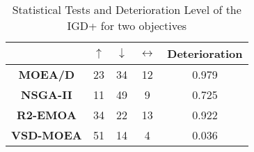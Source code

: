 \begin{table}[t]
\caption{Statistical Tests and Deterioration Level of the IGD+ for two objectives}
\label{tab:Tests_HV_2obj}
\centering
\begin{tabular}{c c|c|c|c}
\cline{2-5}
                                        & \textbf{$\uparrow$} & \textbf{$\downarrow$} & \textbf{$\leftrightarrow$} & \textbf{Deterioration} \\ \hline
\multicolumn{1}{c|}{\textbf{MOEA/D}}   & 23                  & 34                    & 12                         & 0.979         \\ \hline
\multicolumn{1}{c|}{\textbf{NSGA-II}}  & 11                  & 49                    & 9                          & 0.725         \\ \hline
\multicolumn{1}{c|}{\textbf{R2-EMOA}}  & 34                  & 22                    & 13                         & 0.922         \\ \hline
\multicolumn{1}{c|}{\textbf{VSD-MOEA}} & 51                  & 14                    & 4                          & 0.036         \\ \hline
\end{tabular}%
\end{table}

